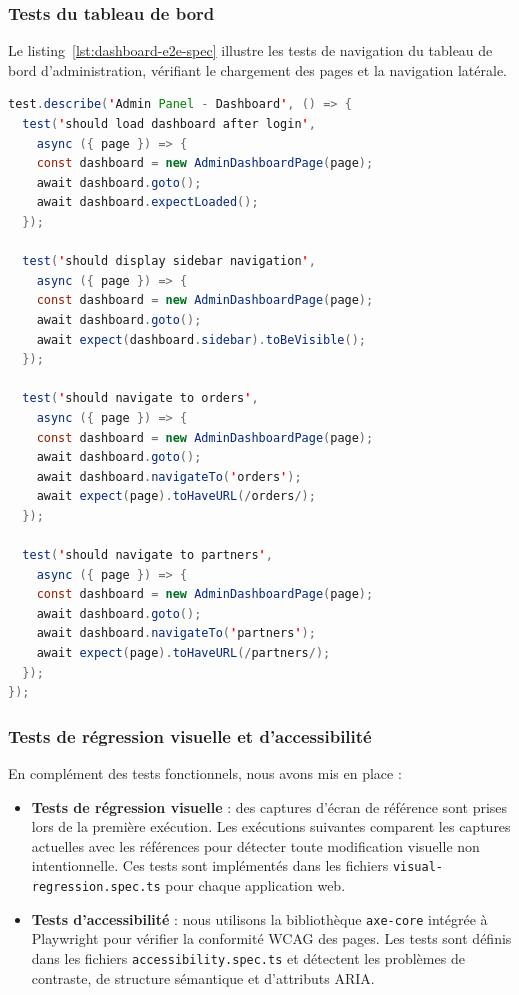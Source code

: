 \subsubsection{Tests du tableau de bord}

Le listing~\ref{lst:dashboard-e2e-spec} illustre les tests de navigation du tableau
de bord d'administration, vérifiant le chargement des pages et la navigation latérale.

\begin{lstlisting}[language=Java, caption={Tests E2E du tableau de bord -- dashboard.spec.ts}, label={lst:dashboard-e2e-spec}]
test.describe('Admin Panel - Dashboard', () => {
  test('should load dashboard after login',
    async ({ page }) => {
    const dashboard = new AdminDashboardPage(page);
    await dashboard.goto();
    await dashboard.expectLoaded();
  });

  test('should display sidebar navigation',
    async ({ page }) => {
    const dashboard = new AdminDashboardPage(page);
    await dashboard.goto();
    await expect(dashboard.sidebar).toBeVisible();
  });

  test('should navigate to orders',
    async ({ page }) => {
    const dashboard = new AdminDashboardPage(page);
    await dashboard.goto();
    await dashboard.navigateTo('orders');
    await expect(page).toHaveURL(/orders/);
  });

  test('should navigate to partners',
    async ({ page }) => {
    const dashboard = new AdminDashboardPage(page);
    await dashboard.goto();
    await dashboard.navigateTo('partners');
    await expect(page).toHaveURL(/partners/);
  });
});
\end{lstlisting}

\subsubsection{Tests de régression visuelle et d'accessibilité}

En complément des tests fonctionnels, nous avons mis en place :

\begin{itemize}
  \item \textbf{Tests de régression visuelle} : des captures d'écran de référence
        sont prises lors de la première exécution. Les exécutions suivantes comparent
        les captures actuelles avec les références pour détecter toute modification
        visuelle non intentionnelle. Ces tests sont implémentés dans les fichiers
        \texttt{visual-regression.spec.ts} pour chaque application web.
  \item \textbf{Tests d'accessibilité} : nous utilisons la bibliothèque
        \texttt{axe-core} intégrée à Playwright pour vérifier la conformité WCAG
        des pages. Les tests sont définis dans les fichiers
        \texttt{accessibility.spec.ts} et détectent les problèmes de contraste,
        de structure sémantique et d'attributs ARIA.
\end{itemize}

